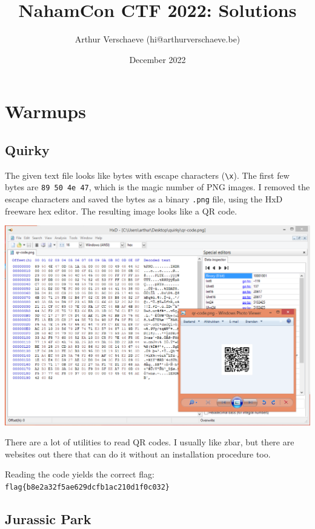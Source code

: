 \documentclass{article}
\title{NahamCon CTF 2022: Solutions} %
\author{Arthur Verschaeve (hi@arthurverschaeve.be)}
\date{December 2022}
\begin{document}
\maketitle

\section{Warmups}
\subsection{Quirky}

The given text file looks like bytes with escape characters (\texttt{\textbackslash x}). The first few bytes are \texttt{89 50 4e 47}, which is the magic number of PNG images. I removed the escape characters and saved the bytes as a binary \texttt{.png} file, using the HxD freeware hex editor. The resulting image looks like a QR code.

\begin{center}
\includegraphics[width=16cm]{quirky/screenshot.png}
\end{center}
\noindent\newline There are a lot of utilities to read QR codes. I usually like zbar, but there are websites out there that can do it without an installation procedure too.

\noindent\newline Reading the code yields the correct flag: \texttt{flag\{b8e2a32f5ae629dcfb1ac210d1f0c032\}}

\subsection{Jurassic Park}
\end{document}
